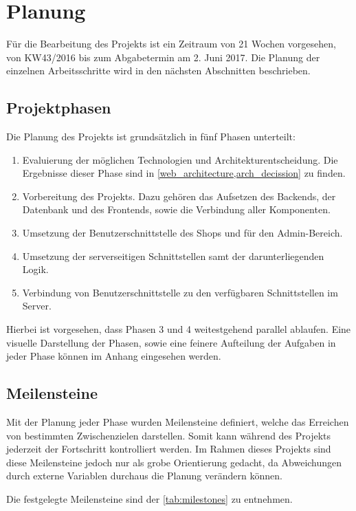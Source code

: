 \section{Planung} \thispagestyle{nomarkstyle}
Für die Bearbeitung des Projekts ist ein Zeitraum von 21 Wochen vorgesehen, von KW43/2016 bis zum Abgabetermin am 2. Juni 2017.
Die Planung der einzelnen Arbeitsschritte wird in den nächsten Abschnitten beschrieben.

\subsection{Projektphasen}
Die Planung des Projekts ist grundsätzlich in fünf Phasen unterteilt:
\begin{enumerate}
	\item Evaluierung der möglichen Technologien und Architekturentscheidung. Die Ergebnisse dieser Phase sind in \cref{web_architecture,arch_decission} zu finden.
	\item Vorbereitung des Projekts. Dazu gehören das Aufsetzen des Backends, der Datenbank und des Frontends, sowie die Verbindung aller Komponenten.
	\item Umsetzung der Benutzerschnittstelle des Shops und für den Admin-Bereich.
	\item Umsetzung der serverseitigen Schnittstellen samt der darunterliegenden Logik.
	\item Verbindung von Benutzerschnittstelle zu den verfügbaren Schnittstellen im Server.
\end{enumerate}

Hierbei ist vorgesehen, dass Phasen 3 und 4 weitestgehend parallel ablaufen. Eine visuelle Darstellung der Phasen, sowie eine feinere Aufteilung der Aufgaben in jeder Phase können im Anhang eingesehen werden. %

\subsection{Meilensteine}
Mit der Planung jeder Phase wurden Meilensteine definiert, welche das Erreichen von bestimmten Zwischenzielen darstellen. Somit kann während des Projekts jederzeit der Fortschritt kontrolliert werden.
Im Rahmen dieses Projekts sind diese Meilensteine jedoch nur als grobe Orientierung gedacht, da Abweichungen durch externe Variablen durchaus die Planung verändern können.

Die festgelegte Meilensteine sind der \cref{tab:milestones} zu entnehmen.

